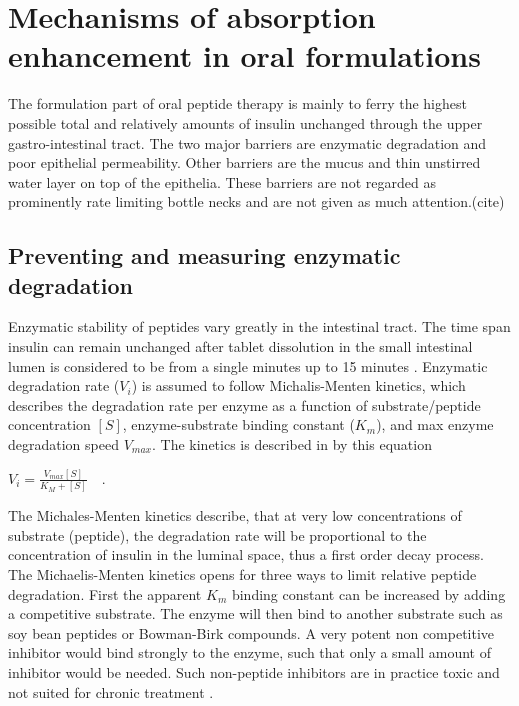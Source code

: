 \section{Mechanisms of absorption enhancement in oral formulations}
The formulation part of oral peptide therapy is mainly to ferry the highest possible total and relatively amounts of insulin unchanged through the upper gastro-intestinal tract. The two major barriers are enzymatic degradation and poor epithelial permeability. Other barriers are the mucus and thin unstirred water layer on top of the epithelia. These barriers are not regarded as prominently rate limiting bottle necks and are not given as much attention.(cite)

\subsection{Preventing and measuring enzymatic degradation}
Enzymatic stability of peptides vary greatly in the intestinal tract. The time span insulin can remain unchanged after tablet dissolution in the small intestinal lumen is considered to be from a single minutes up to 15 minutes \cite{welling2014citric}. Enzymatic degradation rate ($V_i$) is assumed to follow Michalis-Menten kinetics, which describes the degradation rate per enzyme as a function of substrate/peptide concentration $[S]$, enzyme-substrate binding constant ($K_m$), and max enzyme degradation speed $V_{max}$. The kinetics is described in by this equation

$V_i = \frac{V_{max} [S]}{K_{M}+[S]} \quad .$

The Michales-Menten kinetics describe, that at very low concentrations of substrate (peptide), the degradation rate will be proportional to the concentration of insulin in the luminal space, thus a first order decay process. 
The Michaelis-Menten kinetics opens for three ways to limit relative peptide degradation. First the apparent $K_m$ binding constant can be increased by adding a competitive substrate. The enzyme will then bind to another substrate such as soy bean peptides or Bowman-Birk compounds. A very potent non competitive inhibitor would bind strongly to the enzyme, such that only a small amount of inhibitor would be needed. Such non-peptide inhibitors are in practice toxic and not suited for chronic treatment \cite{bernkop1998use,murthy1980effect}. 

